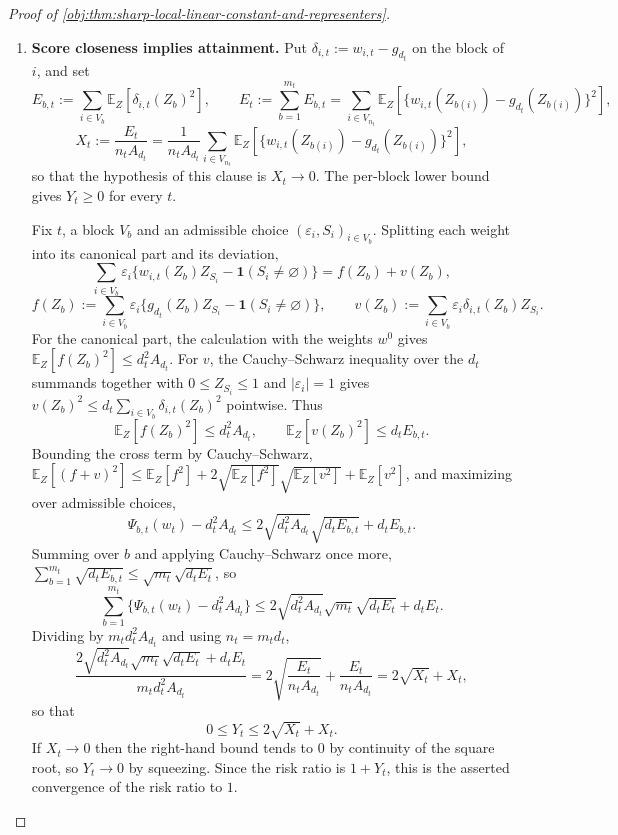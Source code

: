\begin{proof}[Proof of \cref{obj:thm:sharp-local-linear-constant-and-representers}]
\begin{enumerate}
\item \textbf{Score closeness implies attainment.}  Put \(\delta_{i,t}:=w_{i,t}-g_{d_t}\) on the block of \(i\), and set
\[
E_{b,t}:=\sum_{i\in V_b}\mathbb E_Z\!\left[\delta_{i,t}(Z_b)^2\right],
\qquad
E_t:=\sum_{b=1}^{m_t}E_{b,t}
=\sum_{i\in V_{n_t}}\mathbb E_Z\!\left[\bigl\{w_{i,t}(Z_{b(i)})-g_{d_t}(Z_{b(i)})\bigr\}^2\right],
\]
\[
X_t:=\frac{E_t}{n_tA_{d_t}}
=
\frac{1}{n_tA_{d_t}}
\sum_{i\in V_{n_t}}
\mathbb E_Z\!\left[\bigl\{w_{i,t}(Z_{b(i)})-g_{d_t}(Z_{b(i)})\bigr\}^2\right],
\]
so that the hypothesis of this clause is \(X_t\to0\).  The per-block lower bound gives \(Y_t\ge0\) for every \(t\).

Fix \(t\), a block \(V_b\) and an admissible choice \((\varepsilon_i,S_i)_{i\in V_b}\).  Splitting each weight into its canonical part and its deviation,
\[
\sum_{i\in V_b}\varepsilon_i\bigl\{w_{i,t}(Z_b)Z_{S_i}-\mathbf 1(S_i\ne\varnothing)\bigr\}
=
f(Z_b)+v(Z_b),
\]
\[
f(Z_b):=\sum_{i\in V_b}\varepsilon_i\bigl\{g_{d_t}(Z_b)Z_{S_i}-\mathbf 1(S_i\ne\varnothing)\bigr\},
\qquad
v(Z_b):=\sum_{i\in V_b}\varepsilon_i\delta_{i,t}(Z_b)Z_{S_i}.
\]
For the canonical part, the calculation with the weights \(w^0\) gives \(\mathbb E_Z[f(Z_b)^2]\le d_t^2A_{d_t}\).  For \(v\), the Cauchy--Schwarz inequality over the \(d_t\) summands together with \(0\le Z_{S_i}\le1\) and \(|\varepsilon_i|=1\) gives \(v(Z_b)^2\le d_t\sum_{i\in V_b}\delta_{i,t}(Z_b)^2\) pointwise.  Thus
\[
\mathbb E_Z[f(Z_b)^2]\le d_t^2A_{d_t},
\qquad
\mathbb E_Z[v(Z_b)^2]\le d_tE_{b,t}.
\]
Bounding the cross term by Cauchy--Schwarz, \(\mathbb E_Z[(f+v)^2]\le\mathbb E_Z[f^2]+2\sqrt{\mathbb E_Z[f^2]}\sqrt{\mathbb E_Z[v^2]}+\mathbb E_Z[v^2]\), and maximizing over admissible choices,
\[
\Psi_{b,t}(w_t)-d_t^2A_{d_t}
\le
2\sqrt{d_t^2A_{d_t}}\sqrt{d_tE_{b,t}}+d_tE_{b,t}.
\]
Summing over \(b\) and applying Cauchy--Schwarz once more, \(\sum_{b=1}^{m_t}\sqrt{d_tE_{b,t}}\le\sqrt{m_t}\sqrt{d_tE_t}\), so
\[
\sum_{b=1}^{m_t}\bigl\{\Psi_{b,t}(w_t)-d_t^2A_{d_t}\bigr\}
\le
2\sqrt{d_t^2A_{d_t}}\sqrt{m_t}\sqrt{d_tE_t}+d_tE_t .
\]
Dividing by \(m_td_t^2A_{d_t}\) and using \(n_t=m_td_t\),
\[
\frac{
2\sqrt{d_t^2A_{d_t}}\sqrt{m_t}\sqrt{d_tE_t}+d_tE_t
}{
m_td_t^2A_{d_t}
}
=
2\sqrt{\frac{E_t}{n_tA_{d_t}}}+\frac{E_t}{n_tA_{d_t}}
=
2\sqrt{X_t}+X_t ,
\]
so that
\[
0\le Y_t\le 2\sqrt{X_t}+X_t .
\]
If \(X_t\to0\) then the right-hand bound tends to \(0\) by continuity of the square root, so \(Y_t\to0\) by squeezing.  Since the risk ratio is \(1+Y_t\), this is the asserted convergence of the risk ratio to \(1\). %


\end{enumerate}
\end{proof}
